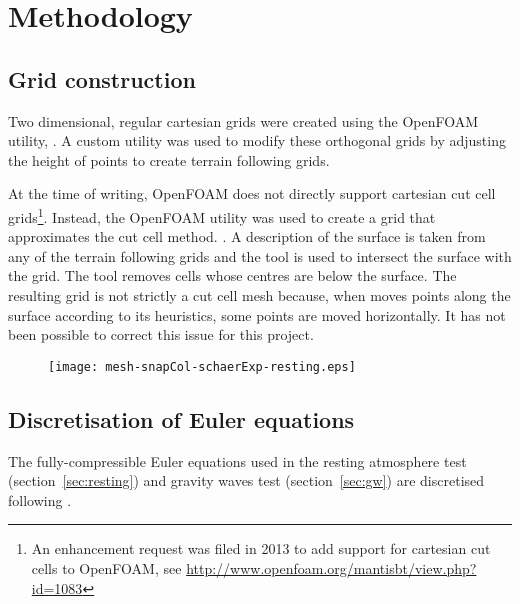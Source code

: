 \chapter{Methodology}

\section{Grid construction}
Two dimensional, regular cartesian grids were created using the OpenFOAM utility, .  A custom utility was used to modify these orthogonal grids by adjusting the height of points to create terrain following grids.

At the time of writing, OpenFOAM does not directly support cartesian cut cell grids\footnote{An enhancement request was filed in 2013 to add support for cartesian cut cells to OpenFOAM, see \url{http://www.openfoam.org/mantisbt/view.php?id=1083}}.  Instead, the  OpenFOAM utility was used to create a grid that approximates the cut cell method.  .  A description of the surface is taken from any of the terrain following grids and the tool is used to intersect the surface with the grid.  The tool removes cells whose centres are below the surface.  The resulting grid is not strictly a cut cell mesh because, when  moves points along the surface according to its heuristics, some points are moved horizontally.  It has not been possible to correct this issue for this project.

\begin{figure}
	\centerfloat
	\texttt{[image: mesh-snapCol-schaerExp-resting.eps]}
	\caption{}
	\label{fig:method:cut-cell}
\end{figure}

\section{Discretisation of Euler equations}
\label{sec:method:discretisation}
The fully-compressible Euler equations used in the resting atmosphere test (section~\ref{sec:resting}) and gravity waves test (section~\ref{sec:gw}) are discretised following \textcite{weller2014}.  
